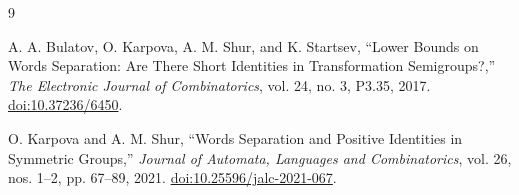 \documentclass[10pt]{article}
\begin{document}
\begin{thebibliography}{9}

A. A. Bulatov, O. Karpova, A. M. Shur, and K. Startsev,
``Lower Bounds on Words Separation: Are There Short Identities in Transformation Semigroups?,''
\emph{The Electronic Journal of Combinatorics}, vol. 24, no. 3, P3.35, 2017.
\href{https://doi.org/10.37236/6450}{doi:10.37236/6450}.

O. Karpova and A. M. Shur,
``Words Separation and Positive Identities in Symmetric Groups,''
\emph{Journal of Automata, Languages and Combinatorics}, vol. 26, nos. 1--2, pp. 67--89, 2021.
\href{https://doi.org/10.25596/jalc-2021-067}{doi:10.25596/jalc-2021-067}.

\end{thebibliography}
\end{document}
